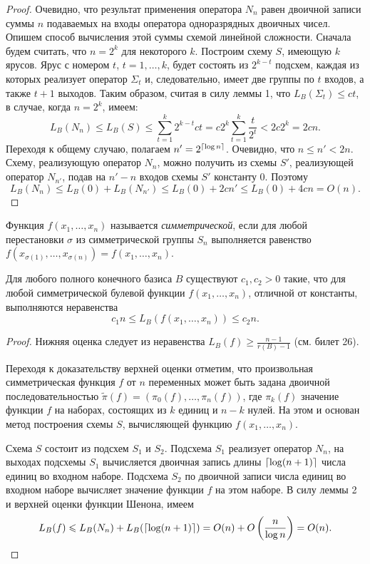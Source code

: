 \begin{proof}
    Очевидно, что результат применения оператора $N_n$ равен двоичной записи суммы $n$ подаваемых на входы оператора одноразрядных двоичных чисел. Опишем способ вычисления этой суммы схемой линейной сложности. Сначала будем считать, что $n = 2^k$ для некоторого $k$. Построим схему $S$, имеющую $k$ ярусов. Ярус с номером $t$, $t = 1,\ldots, k$, будет состоять из $2^{k-t}$ подсхем, каждая из которых реализует оператор $\Sigma_t$ и, следовательно, имеет две группы по $t$ входов, а также $t+1$ выходов. Таким образом, считая в силу леммы 1, что $L_B(\Sigma_t) \leqslant ct$, в случае, когда $n = 2^k$, имеем:
    \[
        L_B(N_n) \leqslant L_B(S) \leqslant \sum_{t=1}^k 2^{k-t}ct = c2^k \sum_{t=1}^k \frac{t}{2^t} < 2c 2^k = 2cn.
    \]
    Переходя к общему случаю, полагаем $n' = 2^{\left\lceil {\log n} \right\rceil}$. Очевидно, что $n \leqslant n' < 2n$. Схему, реализующую оператор $N_n$, можно получить из схемы $S′$, реализующей оператор $N_{n′}$, подав на $n' - n$ входов схемы $S'$ константу 0. Поэтому 
    \[
    L_B(N_n) \leqslant L_B(0) + L_B(N_{n'}) \leqslant L_B(0) + 2cn'
    \leqslant L_B(0) + 4cn = O(n).
    \]
\end{proof}

\begin{definition}
    Функция $f(x_1, \ldots, x_n)$ называется \textit{симметрической}, если для любой перестановки $\sigma$ из симметрической группы $S_n$ выполняется равенство $f(x_{\sigma(1)}, \ldots, x_{\sigma(n)}) = f(x_1, \ldots, x_n)$.
\end{definition}

\begin{theorem}
    Для любого полного конечного базиса $B$ существуют $c_1, c_2 > 0$ такие, что
    для любой симметрической булевой функции $f(x_1, \ldots, x_n)$, отличной от константы, выполняются неравенства
    \[
        c_1n\leqslant L_B(f(x_1, \ldots, x_n)) \leqslant c_2n.
    \]
\end{theorem}

\begin{proof}
    Нижняя оценка следует из неравенства $L_B(f) \geqslant \frac{n-1}{r(B) - 1}$ (см. билет 26).

    Переходя к доказательству верхней оценки отметим, что произвольная симметрическая функция $f$ от $n$ переменных может быть задана двоичной последовательностью $\widetilde{\pi}(f) = (\pi_0(f), \ldots, \pi_n(f))$, где $\pi_k(f)$ значение функции $f$ на наборах, состоящих из $k$ единиц и $n - k$ нулей. На этом и основан метод построения схемы $S$, вычисляющей функцию $f(x_1, \ldots, x_n)$.
    
    Схема $S$ состоит из подсхем $S_1$ и $S_2$. Подсхема $S_1$ реализует оператор $N_n$, на выходах подсхемы $S_1$ вычисляется двоичная запись длины $\left\lceil {\log(n + 1)} \right\rceil$ числа единиц во входном наборе. Подсхема $S_2$ по двоичной записи числа единиц во входном наборе вычисляет значение функции $f$ на этом наборе. В силу леммы 2 и верхней оценки функции Шенона, имеем
    \[
        L_B(f) \leqslant L_B(N_n) + L_B(\left\lceil {\log(n+1)} \right\rceil) = O(n) + O\left(\frac{n}{\log n}\right) = O(n).
    \]
\end{proof}